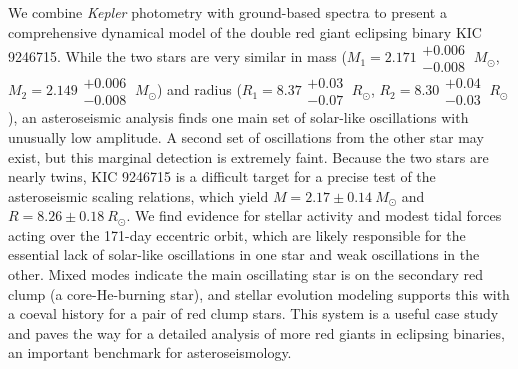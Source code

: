 We combine \emph{Kepler} photometry with ground-based spectra to present a comprehensive dynamical model of the double red giant eclipsing binary KIC 9246715. While the two stars are very similar in mass ($M_1 = 2.171\substack{+0.006 \\ -0.008} \ M_{\odot}$, $M_2 = 2.149\substack{+0.006 \\ -0.008} \ M_{\odot}$) and radius ($R_1 = 8.37\substack{+0.03 \\ -0.07} \ R_{\odot}$, $R_2 = 8.30\substack{+0.04 \\ -0.03} \ R_{\odot}$), an asteroseismic analysis finds one main set of solar-like oscillations with unusually low amplitude. A second set of oscillations from the other star may exist, but this marginal detection is extremely faint. Because the two stars are nearly twins, KIC 9246715 is a difficult target for a precise test of the asteroseismic scaling relations, which yield $M = 2.17\pm0.14 \ M_{\odot}$ and $R = 8.26\pm0.18 \ R_{\odot}$.  We find evidence for stellar activity and modest tidal forces acting over the 171-day eccentric orbit, which are likely responsible for the essential lack of solar-like oscillations in one star and weak oscillations in the other. Mixed modes indicate the main oscillating star is on the secondary red clump (a core-He-burning star), and stellar evolution modeling supports this with a coeval history for a pair of red clump stars. This system is a useful case study and paves the way for a detailed analysis of more red giants in eclipsing binaries, an important benchmark for asteroseismology.
  